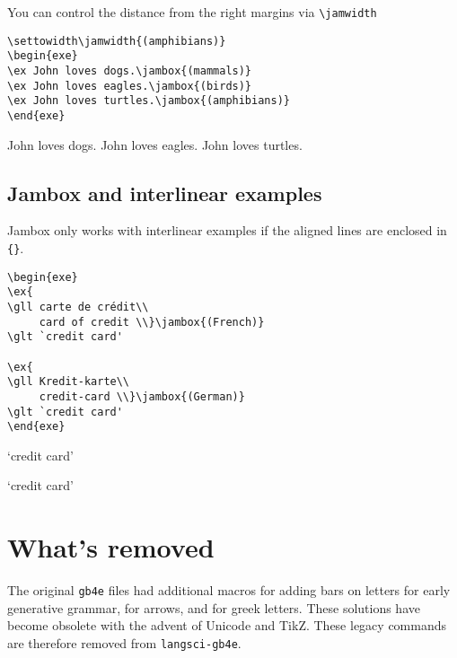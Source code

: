 \documentclass[output=paper]{langscibook}
\newcommand{\cmd}[1]{\texttt{\textbackslash#1}}
\begin{document}
You can control the distance from the right margins via \cmd{jamwidth}

\begin{lstlisting}
\settowidth\jamwidth{(amphibians)}
\begin{exe}
\ex John loves dogs.\jambox{(mammals)}
\ex John loves eagles.\jambox{(birds)}
\ex John loves turtles.\jambox{(amphibians)}   
\end{exe}
 \end{lstlisting}
 
\begin{exe}
\settowidth{}
\ex John loves dogs.
\ex John loves eagles.
\ex John loves turtles.   
\end{exe}  


\subsection{Jambox and interlinear examples} 
Jambox only works with interlinear examples if the aligned lines are enclosed in \texttt{\{\}}. 

\begin{lstlisting}
\begin{exe} 
\ex{
\gll carte de crédit\\
     card of credit \\}\jambox{(French)}
\glt `credit card'

\ex{
\gll Kredit-karte\\
     credit-card \\}\jambox{(German)}
\glt `credit card'
\end{exe} 
 \end{lstlisting}
 
\begin{exe} 
\glt `credit card'

\glt `credit card'
\end{exe} 




\section{What's removed}
The original \texttt{gb4e} files had additional macros for adding bars on letters for early generative grammar, for arrows, and for greek letters. These solutions have become obsolete with the advent of Unicode and TikZ. These legacy commands are therefore removed from \texttt{langsci-gb4e}.
\end{document}
